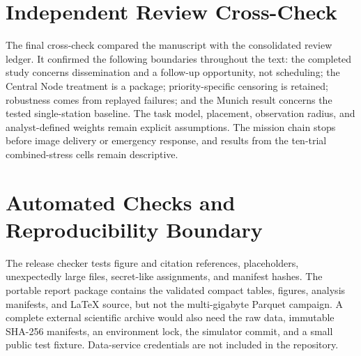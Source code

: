 \section{Independent Review Cross-Check}

The final cross-check compared the manuscript with the consolidated review ledger. It confirmed the following boundaries throughout the text: the completed study concerns dissemination and a follow-up opportunity, not scheduling; the Central Node treatment is a package; priority-specific censoring is retained; robustness comes from replayed failures; and the Munich result concerns the tested single-station baseline. The task model, placement, observation radius, and analyst-defined weights remain explicit assumptions. The mission chain stops before image delivery or emergency response, and results from the ten-trial combined-stress cells remain descriptive.

\section{Automated Checks and Reproducibility Boundary}

The release checker tests figure and citation references, placeholders, unexpectedly large files, secret-like assignments, and manifest hashes. The portable report package contains the validated compact tables, figures, analysis manifests, and LaTeX source, but not the multi-gigabyte Parquet campaign. A complete external scientific archive would also need the raw data, immutable SHA-256 manifests, an environment lock, the simulator commit, and a small public test fixture. Data-service credentials are not included in the repository.
